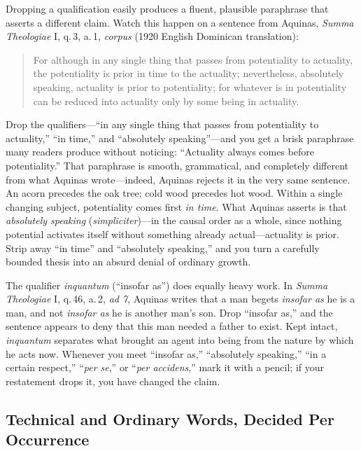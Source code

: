 Dropping a qualification easily produces a fluent, plausible paraphrase that asserts a different claim. Watch this happen on a sentence from Aquinas, \emph{Summa Theologiae} I, q.\,3, a.\,1, \emph{corpus} (1920 English Dominican translation):

\begin{quote}
For although in any single thing that passes from potentiality to actuality, the potentiality is prior in time to the actuality; nevertheless, absolutely speaking, actuality is prior to potentiality; for whatever is in potentiality can be reduced into actuality only by some being in actuality.
\end{quote}

Drop the qualifiers---``in any single thing that passes from potentiality to actuality,'' ``in time,'' and ``absolutely speaking''---and you get a brisk paraphrase many readers produce without noticing: ``Actuality always comes before potentiality.'' That paraphrase is smooth, grammatical, and completely different from what Aquinas wrote---indeed, Aquinas rejects it in the very same sentence. An acorn precedes the oak tree; cold wood precedes hot wood. Within a single changing subject, potentiality comes first \emph{in time}. What Aquinas asserts is that \emph{absolutely speaking} (\emph{simpliciter})---in the causal order as a whole, since nothing potential activates itself without something already actual---actuality is prior. Strip away ``in time'' and ``absolutely speaking,'' and you turn a carefully bounded thesis into an absurd denial of ordinary growth.

The qualifier \emph{inquantum} (``insofar as'') does equally heavy work. In \emph{Summa Theologiae} I, q.\,46, a.\,2, \emph{ad 7}, Aquinas writes that a man begets \emph{insofar as} he is a man, and not \emph{insofar as} he is another man's son. Drop ``insofar as,'' and the sentence appears to deny that this man needed a father to exist. Kept intact, \emph{inquantum} separates what brought an agent into being from the nature by which he acts now. Whenever you meet ``insofar as,'' ``absolutely speaking,'' ``in a certain respect,'' ``\emph{per se},'' or ``\emph{per accidens},'' mark it with a pencil; if your restatement drops it, you have changed the claim.

\subsection{Technical and Ordinary Words, Decided Per Occurrence}

